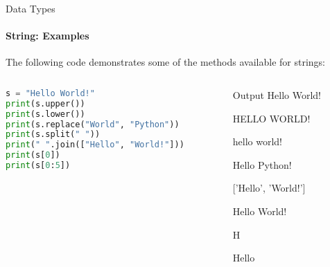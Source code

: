 \documentclass[
    aspectratio=169, 
    usepdftitle=false, 
    xcolor={dvipsnames},
    hyperref={
        colorlinks,
        linkcolor=black,
        urlcolor=blue}
    ]{beamer}
\begin{document}
\begin{frame}[fragile]{Data Types}
    \framesubtitle{String: Examples}

    The following code demonstrates some of the methods available for strings:

    \begin{columns}
        \begin{column}{0.5\textwidth}

            \begin{lstlisting}[language=Python]
s = "Hello World!"
print(s.upper())
print(s.lower())
print(s.replace("World", "Python"))
print(s.split(" "))
print(" ".join(["Hello", "World!"]))
print(s[0])
print(s[0:5])
            \end{lstlisting}

        \end{column}
        \begin{column}{0.4\textwidth}

            \begin{block}{Output}
                Hello World!

                HELLO WORLD!

                hello world!

                Hello Python!

                ['Hello', 'World!']

                Hello World!

                H

                Hello

            \end{block}
        \end{column}
    \end{columns}
\end{frame}
\end{document}
